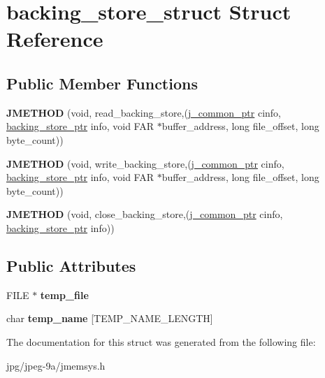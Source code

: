 \hypertarget{structbacking__store__struct}{\section{backing\+\_\+store\+\_\+struct Struct Reference}
\label{structbacking__store__struct}
}
\subsection*{Public Member Functions}
\begin{DoxyCompactItemize}
\item 
\hypertarget{structbacking__store__struct_a22c5a1f420b61a5c3f48e857d61ceb35}{{\bfseries J\+M\+E\+T\+H\+O\+D} (void, read\+\_\+backing\+\_\+store,(\hyperlink{structjpeg__common__struct}{j\+\_\+common\+\_\+ptr} cinfo, \hyperlink{structbacking__store__struct}{backing\+\_\+store\+\_\+ptr} info, void F\+A\+R $\ast$buffer\+\_\+address, long file\+\_\+offset, long byte\+\_\+count))}\label{structbacking__store__struct_a22c5a1f420b61a5c3f48e857d61ceb35}

\item 
\hypertarget{structbacking__store__struct_aa54343491f740a9d799eeb9c3e7e09d2}{{\bfseries J\+M\+E\+T\+H\+O\+D} (void, write\+\_\+backing\+\_\+store,(\hyperlink{structjpeg__common__struct}{j\+\_\+common\+\_\+ptr} cinfo, \hyperlink{structbacking__store__struct}{backing\+\_\+store\+\_\+ptr} info, void F\+A\+R $\ast$buffer\+\_\+address, long file\+\_\+offset, long byte\+\_\+count))}\label{structbacking__store__struct_aa54343491f740a9d799eeb9c3e7e09d2}

\item 
\hypertarget{structbacking__store__struct_a509740a807e120959a02d25ac245eea4}{{\bfseries J\+M\+E\+T\+H\+O\+D} (void, close\+\_\+backing\+\_\+store,(\hyperlink{structjpeg__common__struct}{j\+\_\+common\+\_\+ptr} cinfo, \hyperlink{structbacking__store__struct}{backing\+\_\+store\+\_\+ptr} info))}\label{structbacking__store__struct_a509740a807e120959a02d25ac245eea4}

\end{DoxyCompactItemize}
\subsection*{Public Attributes}
\begin{DoxyCompactItemize}
\item 
\hypertarget{structbacking__store__struct_a90903f2f62f4fe65ac65599b50d0411e}{F\+I\+L\+E $\ast$ {\bfseries temp\+\_\+file}}\label{structbacking__store__struct_a90903f2f62f4fe65ac65599b50d0411e}

\item 
\hypertarget{structbacking__store__struct_aee24b7268410bcf129e83a8e2a2f4d45}{char {\bfseries temp\+\_\+name} \mbox{[}T\+E\+M\+P\+\_\+\+N\+A\+M\+E\+\_\+\+L\+E\+N\+G\+T\+H\mbox{]}}\label{structbacking__store__struct_aee24b7268410bcf129e83a8e2a2f4d45}

\end{DoxyCompactItemize}


The documentation for this struct was generated from the following file\+:\begin{DoxyCompactItemize}
\item 
jpg/jpeg-\/9a/jmemsys.\+h\end{DoxyCompactItemize}
